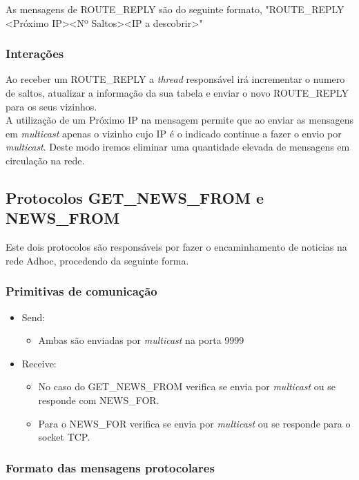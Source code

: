 \documentclass{llncs}
\begin{document}
As mensagens de ROUTE\_REPLY são do seguinte formato, "ROUTE\_REPLY \textless Próximo IP\textgreater \textless Nº Saltos\textgreater \textless IP a descobrir\textgreater"

\subsubsection{Interações}

Ao receber um ROUTE\_REPLY a \emph{thread} responsável irá incrementar o numero de saltos, atualizar a informação da sua tabela e enviar o novo ROUTE\_REPLY para os seus vizinhos.\\
A utilização de um Próximo IP na mensagem permite que ao enviar as mensagens em \emph{multicast} apenas o vizinho cujo IP é o indicado continue a fazer o envio por \emph{multicast}. Deste modo iremos eliminar uma quantidade elevada de mensagens em circulação na rede.

\clearpage

\subsection{Protocolos GET\_NEWS\_FROM e NEWS\_FROM}

Este dois protocolos são responsáveis por fazer o encaminhamento de noticias na rede Adhoc, procedendo da seguinte forma.

\subsubsection{Primitivas de comunicação}

\begin{itemize}
    \item Send: \begin{itemize}
        \item Ambas são enviadas por \emph{multicast} na porta 9999
    \end{itemize}
    \item Receive: \begin{itemize}
        \item No caso do GET\_NEWS\_FROM verifica se envia por \emph{multicast} ou se responde com NEWS\_FOR.
        \item Para o NEWS\_FOR verifica se envia por \emph{multicast} ou se responde para o socket TCP.
    \end{itemize}
\end{itemize}


\subsubsection{Formato das mensagens protocolares}
\end{document}
